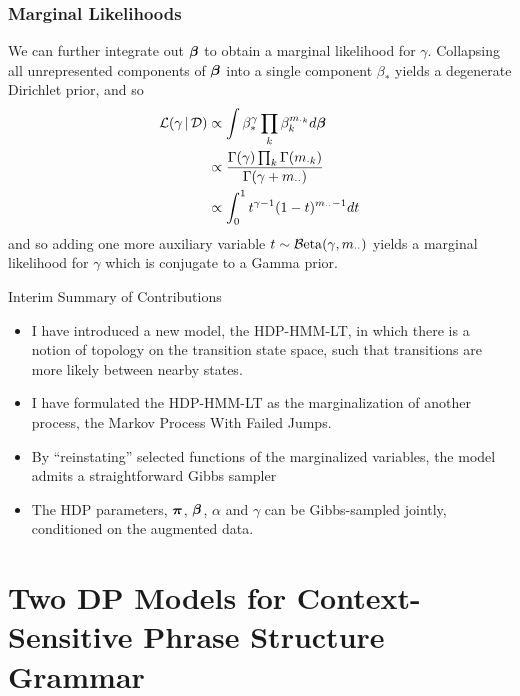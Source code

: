 \documentclass[11pt, serif, mathserif, table,trans]{beamer}
\begin{document}
\begin{frame}
  \frametitle{Marginal Likelihoods}
  We can further integrate out $\boldsymbol{\beta}$ to obtain a marginal likelihood
  for $\gamma$.  Collapsing all unrepresented components of $\boldsymbol{\beta}$
  into a single component $\beta_{*}$ yields a degenerate Dirichlet prior, and so
    \begin{align}
      \label{eq:23}
      \mathcal{L}(\gamma \, \vert \, \mathcal{D}) &\propto \int
      \beta_{*}^{\gamma} \prod_{k} \beta_k^{m_{\cdot k}} d\boldsymbol{\beta} \\
      &\propto \frac{\Gamma(\gamma) \prod_{k} \Gamma(m_{\cdot
          k})}{\Gamma(\gamma + m_{\cdot\cdot})} \\
      &\propto \int_{0}^{1} t^{\gamma - 1} (1 - t)^{m_{\cdot\cdot} -
        1} dt
    \end{align}
    and so adding one more auxiliary variable $t \sim
    \mathcal{B}\mathrm{eta}(\gamma,m_{\cdot\cdot})$ yields a marginal likelihood for
    $\gamma$ which is conjugate to a Gamma prior.
\end{frame}
\begin{frame}
  \begin{infoblock}{Interim Summary of Contributions}
    \begin{itemize}
      \item I have introduced a new model, the HDP-HMM-LT, in which there is a
      notion of topology on the transition state space, such that
      transitions are more likely between nearby states.
      \item I have formulated the HDP-HMM-LT as the marginalization of
        another process, the Markov Process With Failed Jumps.
      \item By ``reinstating'' selected functions of the marginalized
        variables, the model admits a straightforward Gibbs sampler
      \item The HDP parameters, $\boldsymbol{\pi}$, $\boldsymbol{\beta}$, $\alpha$ and
        $\gamma$ can be Gibbs-sampled jointly, conditioned on the
        augmented data.
    \end{itemize}
\end{infoblock}
\end{frame}


\section{Two DP Models for Context-Sensitive Phrase Structure Grammar}
\label{sec:two-dp-models}
\end{document}
